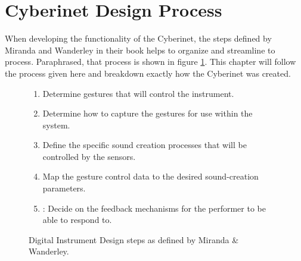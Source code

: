 


\section{Cyberinet Design Process}


When developing the functionality of the Cyberinet, the steps defined by Miranda and Wanderley in their book\cite{miranda_Wanderley_instrumentControl_2006} helps to organize and streamline to process. Paraphrased, that process is shown in figure \ref{fig:DMIProcess}. This chapter will follow the process given here and breakdown exactly how the Cyberinet was created.

\begin{figure}
    \centering
    \begin{enumerate}
    \item Determine gestures that will control the instrument.
    \item Determine how to capture the gestures for use within the system.
    \item Define the specific sound creation processes that will be controlled by the sensors.
    \item Map the gesture control data to the desired sound-creation parameters.
    \item: Decide on the feedback mechanisms for the performer to be able to respond to.
\end{enumerate}
    \caption{Digital Instrument Design steps as defined by Miranda \& Wanderley.\cite{miranda_Wanderley_instrumentControl_2006}}
    \label{fig:DMIProcess}
\end{figure}

